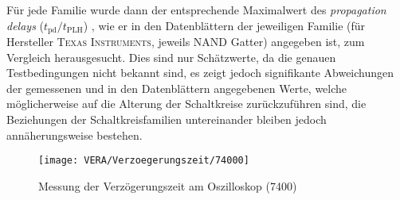 Für jede Familie wurde dann der entsprechende Maximalwert des \textit{propagation delays}
($t_{\textrm{pd}} / t_\textrm{PLH}$) , wie er in den Datenblättern der
jeweiligen Familie (für Hersteller \textsc{Texas Instruments},
jeweils NAND Gatter) angegeben ist, zum Vergleich herausgesucht. 
Dies sind nur Schätzwerte, da die genauen Testbedingungen nicht bekannt sind, es
zeigt jedoch signifikante Abweichungen der gemessenen und in den Datenblättern
angegebenen Werte, welche möglicherweise auf die Alterung der Schaltkreise
zurückzuführen sind, die Beziehungen der Schaltkreisfamilien untereinander bleiben
jedoch annäherungsweise bestehen.

  \begin{figure}[h]
  \begin{center}
    \texttt{[image: VERA/Verzoegerungszeit/74000]}
  \end{center}
  \caption{Messung der Verzögerungszeit am Oszilloskop (7400)}
  \label{fig:biepbiep}
\end{figure}
